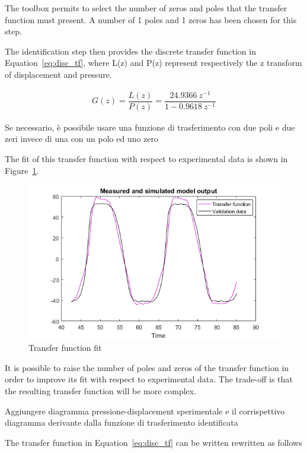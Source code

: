 The toolbox permits to select the number of zeros and poles that the transfer function
must present. A number of 1 poles and 1 zeros has been chosen for this step.

The identification step then provides the discrete transfer function
in Equation~\ref{eq:disc_tf}, where L(z) and P(z) represent respectively the z transform
of displacement and pressure.

\begin{align}
G(z) = \dfrac{L(z)}{P(z)} = \dfrac{24.9366\ z^{-1}}{1-0.9618\ z^{-1}}
\label{eq:disc_tf}
\end{align}

{\color{red}Se necessario, è possibile usare una funzione di trasferimento con due poli e due zeri invece di una con un polo ed uno zero}

The fit of this transfer function with respect to experimental data is shown
in Figure~\ref{fig:fit}.

\begin{figure}[H]
	\centering
	\includegraphics[width=\linewidth]{"Images/fit"}
	\caption[Transfer function fit]{Transfer function fit}
	\label{fig:fit}
\end{figure}

It is possible to raise the number of poles and zeros of the transfer function
in order to improve its fit with respect to experimental data. 
The trade-off is that the resulting transfer function will be more complex.

{\color{red}Aggiungere diagramma pressione-displacement sperimentale e il corrispettivo diagramma derivante dalla funzione di trasferimento identificata}

The transfer function in Equation~\ref{eq:disc_tf} can be written rewritten as follows

